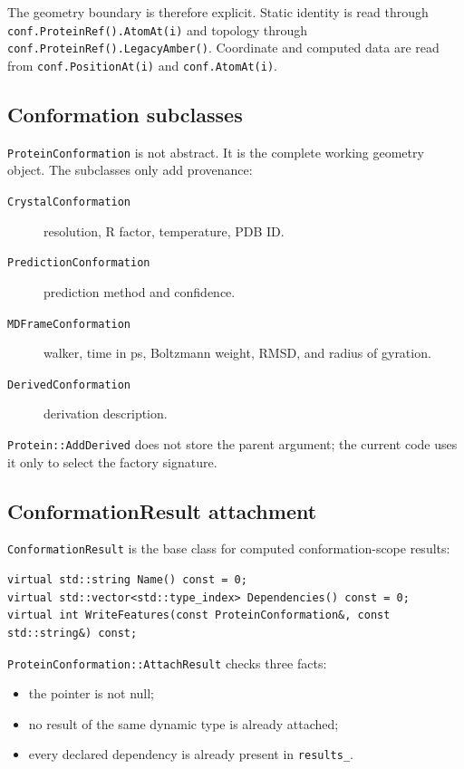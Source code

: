 \documentclass[11pt]{article}
\newcommand{\code}[1]{\texttt{#1}}
\begin{document}
The geometry boundary is therefore explicit. Static identity is read through
\code{conf.ProteinRef().AtomAt(i)} and topology through
\code{conf.ProteinRef().LegacyAmber()}. Coordinate and computed data are read
from \code{conf.PositionAt(i)} and \code{conf.AtomAt(i)}.

\subsection{Conformation subclasses}

\code{ProteinConformation} is not abstract. It is the complete working
geometry object. The subclasses only add provenance:

\begin{description}
\item[\code{CrystalConformation}] resolution, R factor, temperature, PDB ID.
\item[\code{PredictionConformation}] prediction method and confidence.
\item[\code{MDFrameConformation}] walker, time in ps, Boltzmann weight, RMSD,
and radius of gyration.
\item[\code{DerivedConformation}] derivation description.
\end{description}

\code{Protein::AddDerived} does not store the parent argument; the current
code uses it only to select the factory signature.

\subsection{ConformationResult attachment}

\code{ConformationResult} is the base class for computed conformation-scope
results:

\begin{lstlisting}
virtual std::string Name() const = 0;
virtual std::vector<std::type_index> Dependencies() const = 0;
virtual int WriteFeatures(const ProteinConformation&, const std::string&) const;
\end{lstlisting}

\code{ProteinConformation::AttachResult} checks three facts:

\begin{itemize}
\item the pointer is not null;
\item no result of the same dynamic type is already attached;
\item every declared dependency is already present in \code{results\_}.
\end{itemize}
\end{document}
